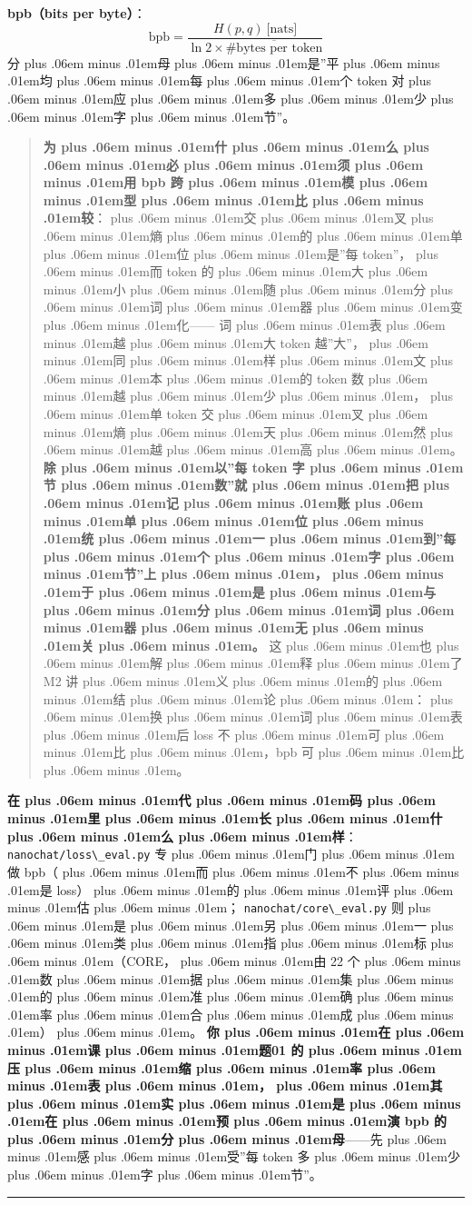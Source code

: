 \documentclass[
]{article}
\newcommand{\passthrough}[1]{#1}
\def\zh#1{{\zhfont #1}}
\def\zhglue{\hskip0pt plus .06em minus .01em}
\begin{document}
\textbf{bpb\zh{（}bits per byte\zh{）}}\zh{：} \[\mathrm{bpb} = \frac{H(p,q)\ \text{[nats]}}{\ln 2 \times \overline{\#\text{bytes per token}}}\] \zh{分\zhglue 母\zhglue 是}''\zh{平\zhglue 均\zhglue 每\zhglue 个} token \zh{对\zhglue 应\zhglue 多\zhglue 少\zhglue 字\zhglue 节}''\zh{。}

\begin{quote}
\textbf{\zh{为\zhglue 什\zhglue 么\zhglue 必\zhglue 须\zhglue 用} bpb \zh{跨\zhglue 模\zhglue 型\zhglue 比\zhglue 较}}\zh{：\zhglue 交\zhglue 叉\zhglue 熵\zhglue 的\zhglue 单\zhglue 位\zhglue 是}''\zh{每} token''\zh{，\zhglue 而} token \zh{的\zhglue 大\zhglue 小\zhglue 随\zhglue 分\zhglue 词\zhglue 器\zhglue 变\zhglue 化}------ \zh{词\zhglue 表\zhglue 越\zhglue 大} token \zh{越}''\zh{大}''\zh{，\zhglue 同\zhglue 样\zhglue 文\zhglue 本\zhglue 的} token \zh{数\zhglue 越\zhglue 少\zhglue ，\zhglue 单} token \zh{交\zhglue 叉\zhglue 熵\zhglue 天\zhglue 然\zhglue 越\zhglue 高\zhglue 。} \textbf{\zh{除\zhglue 以}''\zh{每} token \zh{字\zhglue 节\zhglue 数}''\zh{就\zhglue 把\zhglue 记\zhglue 账\zhglue 单\zhglue 位\zhglue 统\zhglue 一\zhglue 到}''\zh{每\zhglue 个\zhglue 字\zhglue 节}''\zh{上\zhglue ，\zhglue 于\zhglue 是\zhglue 与\zhglue 分\zhglue 词\zhglue 器\zhglue 无\zhglue 关\zhglue 。}} \zh{这\zhglue 也\zhglue 解\zhglue 释\zhglue 了} M2 \zh{讲\zhglue 义\zhglue 的\zhglue 结\zhglue 论\zhglue ：\zhglue 换\zhglue 词\zhglue 表\zhglue 后} loss \zh{不\zhglue 可\zhglue 比\zhglue ，}bpb \zh{可\zhglue 比\zhglue 。}
\end{quote}

\textbf{\zh{在\zhglue 代\zhglue 码\zhglue 里\zhglue 长\zhglue 什\zhglue 么\zhglue 样}}\zh{：}\passthrough{\lstinline!nanochat/loss\_eval.py!} \zh{专\zhglue 门\zhglue 做} bpb\zh{（\zhglue 而\zhglue 不\zhglue 是} loss\zh{）\zhglue 的\zhglue 评\zhglue 估\zhglue ；} \passthrough{\lstinline!nanochat/core\_eval.py!} \zh{则\zhglue 是\zhglue 另\zhglue 一\zhglue 类\zhglue 指\zhglue 标\zhglue （}CORE\zh{，\zhglue 由} 22 \zh{个\zhglue 数\zhglue 据\zhglue 集\zhglue 的\zhglue 准\zhglue 确\zhglue 率\zhglue 合\zhglue 成\zhglue ）\zhglue 。} \textbf{\zh{你\zhglue 在\zhglue 课\zhglue 题}01 \zh{的\zhglue 压\zhglue 缩\zhglue 率\zhglue 表\zhglue ，\zhglue 其\zhglue 实\zhglue 是\zhglue 在\zhglue 预\zhglue 演} bpb \zh{的\zhglue 分\zhglue 母}}------\zh{先\zhglue 感\zhglue 受}''\zh{每} token \zh{多\zhglue 少\zhglue 字\zhglue 节}''\zh{。}

\begin{center}\rule{0.5\linewidth}{0.5pt}\end{center}
\end{document}
